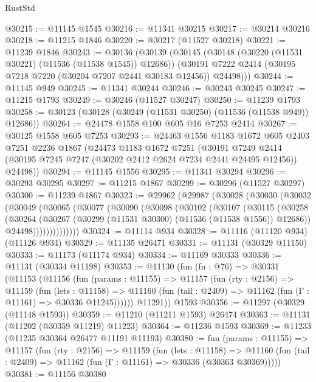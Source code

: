 \begin{lexlean}{RustStd}
\begin{coremodule}
@30215 := @11145 @1545
@30216 := @11341 @30215
@30217 := @30214 @30216
@30218 := @11215 @1846
@30220 := @30217 (@11527 @30218)
@30221 := @11239 @1846
@30243 := @30136
    (@30139
      (@30145
        (@30148 (@30220 (@11531 @30221) (@11536 (@11538 @1545)) @12686))
        (@30191 @7222 @2414 (@30195 @7218 @7220 (@30204 @7207 @2441 @30183 @12456)) @24498)))
@30244 := @11145 @949
@30245 := @11341 @30244
@30246 := @30243 @30245
@30247 := @11215 @1793
@30249 := @30246 (@11527 @30247)
@30250 := @11239 @1793
@30258 := @30123 (@30128 (@30249 (@11531 @30250) (@11536 (@11538 @949)) @12686))
@30264 := @24478 @1558 @100 @605 @16 @7253 @2414
@30267 := @30125 @1558 @605 @7253
@30293 := @24463
    @1556
    @1183
    @1672
    @605
    @2403
    @7251
    @2236
    @1867
    (@24473
      @1183
      @1672
      @7251
      (@30191
        @7249
        @2414
        (@30195 @7245 @7247 (@30202 @2412 @2624 @7234 @2441 @24495 @12456))
        @24498))
@30294 := @11145 @1556
@30295 := @11341 @30294
@30296 := @30293 @30295
@30297 := @11215 @1867
@30299 := @30296 (@11527 @30297)
@30300 := @11239 @1867
@30323 := @29962
    (@29987
      (@30028
        (@30030
          (@30032
            (@30049
              (@30065
                (@30077
                  (@30090
                    (@30098
                      (@30102
                        (@30107
                          (@30115
                            (@30258
                              (@30264
                                (@30267 (@30299 (@11531 @30300) (@11536 (@11538 @1556)) @12686))
                                @24498))))))))))))))
@30324 := @11114 @934
@30328 := @11116 (@11120 @934) (@11126 @934)
@30329 := @11135 @26471
@30331 := @11131 (@30329 @11150)
@30333 := @11173 (@11174 @934)
@30334 := @11169 @30333
@30336 := @11131 (@30334 @11198)
@30353 := @11130
    (fun (fn : @76) =>
    @30331
      (@11153
        (@11156
          (fun (params : @11155) =>
          @11157
            (fun (rty : @2156) =>
            @11159
              (fun (lets : @11158) =>
              @11160 (fun (tail : @2409) => @11162 (fun (Γ : @11161) => @30336 @11245))))))
        @11291))
    @1593
@30356 := @11297 (@30329 (@11148 @1593))
@30359 := @11210 (@11211 @1593) @26474
@30363 := @11131 (@11202 (@30359 @11219) @11223)
@30364 := @11236 @1593
@30369 := @11233 (@11235 @30364 @26477 @11191 @11193)
@30380 := fun (params : @11155) =>
  @11157
    (fun (rty : @2156) =>
    @11159
      (fun (lets : @11158) =>
      @11160 (fun (tail : @2409) => @11162 (fun (Γ : @11161) => @30336 (@30363 @30369)))))
@30381 := @11156 @30380

\end{coremodule}
\end{lexlean}
